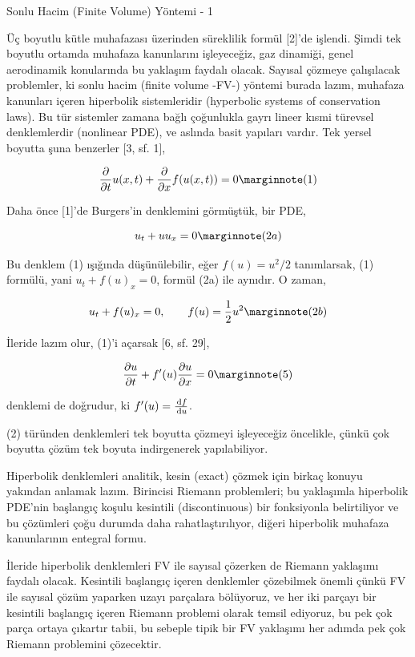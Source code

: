 \documentclass[12pt,fleqn]{article}\usepackage{../../common}
\begin{document}
Sonlu Hacim (Finite Volume) Yöntemi - 1

Üç boyutlu kütle muhafazası üzerinden süreklilik formül [2]'de işlendi.  Şimdi
tek boyutlu ortamda muhafaza kanunlarını işleyeceğiz, gaz dinamiği, genel
aerodinamik konularında bu yaklaşım faydalı olacak. Sayısal çözmeye çalışılacak
problemler, ki sonlu hacim (finite volume -FV-) yöntemi burada lazım, muhafaza
kanunları içeren hiperbolik sistemleridir (hyperbolic systems of conservation
laws). Bu tür sistemler zamana bağlı çoğunlukla gayrı lineer kısmi türevsel
denklemlerdir (nonlinear PDE), ve aslında basit yapıları vardır. Tek yersel
boyutta şuna benzerler [3, sf. 1],

$$
\frac{\partial }{\partial t} u(x,t) + 
\frac{\partial }{\partial x} f(u(x,t)) = 0
\mlabel{1}
$$

Daha önce [1]'de Burgers'in denklemini görmüştük, bir PDE,

$$
u_t + uu_x = 0
\mlabel{2a}
$$

Bu denklem (1) ışığında düşünülebilir, eğer $f(u) = u^2/2$ tanımlarsak,
(1) formülü, yani $u_t + f(u)_x = 0$, formül (2a) ile aynıdır. O zaman,

$$
u_t + f(u)_x = 0, \qquad f(u) = \frac{1}{2}u^2
\mlabel{2b}
$$

İleride lazım olur, (1)'i açarsak [6, sf. 29],

$$
\frac{\partial u}{\partial t} + 
f'(u) \frac{\partial u}{\partial x} = 0
\mlabel{5}
$$

denklemi de doğrudur, ki $f'(u) = \frac{\,\mathrm{d} f}{\,\mathrm{d} u}$.

(2) türünden denklemleri tek boyutta çözmeyi işleyeceğiz öncelikle, çünkü çok
boyutta çözüm tek boyuta indirgenerek yapılabiliyor.

Hiperbolik denklemleri analitik, kesin (exact) çözmek için birkaç konuyu
yakından anlamak lazım. Birincisi Riemann problemleri; bu yaklaşımla hiperbolik
PDE'nin başlangıç koşulu kesintili (discontinuous) bir fonksiyonla belirtiliyor
ve bu çözümleri çoğu durumda daha rahatlaştırılıyor, diğeri hiperbolik muhafaza
kanunlarının entegral formu.

İleride hiperbolik denklemleri FV ile sayısal çözerken de Riemann yaklaşımı
faydalı olacak. Kesintili başlangıç içeren denklemler çözebilmek önemli çünkü FV
ile sayısal çözüm yaparken uzayı parçalara bölüyoruz, ve her iki parçayı bir
kesintili başlangıç içeren Riemann problemi olarak temsil ediyoruz, bu pek çok
parça ortaya çıkartır tabii, bu sebeple tipik bir FV yaklaşımı her adımda pek
çok Riemann problemini çözecektir.
\end{document}
